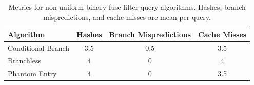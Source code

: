 \begin{table}[H]
    \centering
    \begin{tabular}{lccc}
        \toprule
        Algorithm & Hashes & Branch Mispredictions & Cache Misses \\
        \midrule
        Conditional Branch & 3.5 & 0.5 & 3.5 \\
        Branchless        & 4   & 0   & 4   \\
        Phantom Entry     & 4   & 0   & 3.5 \\
    \bottomrule
    \end{tabular}
    \caption{Metrics for non-uniform binary fuse filter query algorithms. Hashes, branch mispredictions, and cache misses are mean per query.}
    \label{tab:csc592_bigdata_impl_tab}
\end{table}